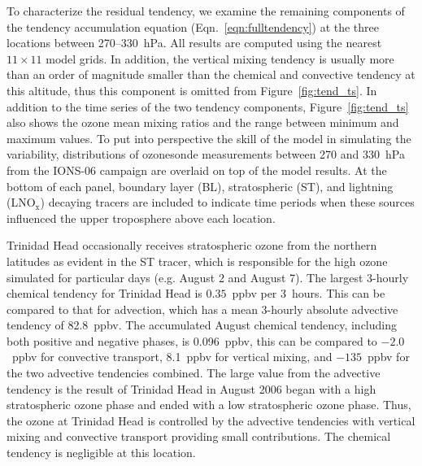 To characterize the residual tendency, we examine the remaining
components of the tendency accumulation equation (Eqn.~\ref{eqn:fulltendency}) at the three
locations between 270--330~hPa. All results are computed using the nearest $11\times11$ model grids.
In addition, the vertical mixing tendency is usually more than an order of magnitude smaller than the
chemical and convective tendency at this altitude, thus this component is omitted from Figure~\ref{fig:tend_ts}.
In addition to the time series of the two tendency components,
Figure~\ref{fig:tend_ts} also shows the ozone mean mixing ratios and the range between minimum and maximum values. To put into
perspective the skill of the model in simulating the variability, distributions of ozonesonde measurements
between 270 and 330~hPa from the IONS-06 campaign \citep{Thompson:2008rp} are
overlaid on top of the model results. At the bottom of each panel, boundary layer (BL), stratospheric
(ST), and lightning (LNO$_{\mathrm{x}}$) decaying tracers are included to indicate time periods
when these sources influenced the upper troposphere above each location.

Trinidad Head occasionally receives stratospheric ozone from the northern latitudes as evident in the ST tracer, which is
responsible for the high ozone simulated for particular days
(e.g. August 2 and August 7). The largest 3-hourly chemical tendency for Trinidad Head is
$0.35$~ppbv per 3~hours. This can be compared to that for advection, which has a mean
3-hourly absolute advective tendency of 82.8~ppbv. The accumulated August chemical
tendency, including both positive and negative phases, is 0.096~ppbv, this can be compared
to $-2.0$~ppbv for convective transport, 8.1~ppbv for vertical mixing, and $-135$~ppbv for
the two advective tendencies combined. The large value from the advective tendency
is the result of Trinidad Head in August 2006 began with a high stratospheric
ozone phase and ended with a low stratospheric ozone phase. Thus, the ozone at Trinidad Head is
controlled by the advective tendencies with vertical mixing and convective transport providing
small contributions. The chemical tendency is negligible at this location.

